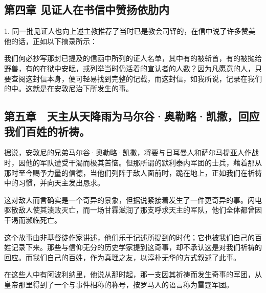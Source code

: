 
\subsection{第四章 见证人在书信中赞扬依肋内}

1. 同一批见证人也向上述主教推荐了当时已是教会司铎的，在信中说了许多赞美他的话，正如以下摘录所示：\par

\par

我们何必抄写那封已提及的信函中所列的证人名单，其中有的被斩首，有的被抛给野兽，有的在狱中安眠，或列举当时仍活着的宣认者的人数？因为凡愿意的人，只要查阅这封信本身，便可轻易找到完整的记载，而这封信，如我所说，记录在我们的中。这就是在安敦尼治下所发生的事。\par


\subsection{第五章　天主从天降雨为马尔谷·奥勒略·凯撒，回应我们百姓的祈祷。}

据说，安敦尼的兄弟马尔谷·奥勒略·凯撒，将要与日耳曼人和萨尔马提亚人作战时，因他的军队遭受干渴而极其苦恼。但那所谓的默利泰内军团的士兵，藉着那从那时至今赐予力量的信德，当他们列阵于敌人面前时，跪在地上，正如我们在祈祷中的习惯，并向天主发出恳求。\par

这对敌人而言确实是一个奇异的景象，但据说紧接着发生了一件更奇异的事。闪电驱散敌人使其溃败灭亡，而一场甘霖滋润了那支呼求天主的军队，他们全体都曾因干渴而濒临死亡。\par

这个故事由非基督徒作家讲述，他们乐于记述所提到的时代；它也被我们自己的百姓记录下来。那些与信仰无分的历史学家提到这奇事，却不承认这是对我们祈祷的回应。而我们自己的百姓，作为真理之友，以淳朴无华的方式叙述了此事。\par

在这些人中有阿波利纳里，他说从那时起，那一支因其祈祷而发生奇事的军团，从皇帝那里得到了一个与事件相称的称号，按罗马人的语言称为雷霆军团。\par

